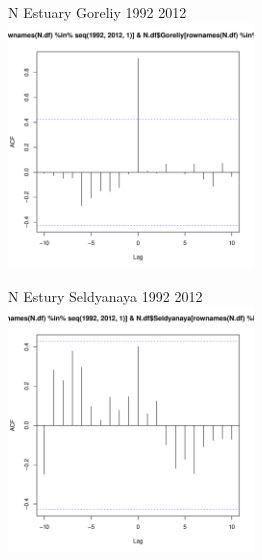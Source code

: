 \documentclass[12pt, a4paper]{disser}
\begin{document}
	\begin{figure}[ht]
	
	\begin{minipage}[b]{.46\linewidth}
	\begin{center}
	{\tiny N Estuary Goreliy 1992 2012}
		\includegraphics[width=65mm]{../White_Sea/dynamic_N_N1/crosscorr_N_Estury_Goreliy_1992_2012.pdf}

	\end{center}
	\end{minipage}
	\hfil %
	\begin{minipage}[b]{.46\linewidth}
	\begin{center}
	{\tiny N Estury Seldyanaya 1992 2012}
		\includegraphics[width=65mm]{../White_Sea/dynamic_N_N1/crosscorr_N_Estury_Seldyanaya_1992_2012.pdf}
	\end{center}
	\end{minipage}




\end{figure}
\end{document}
